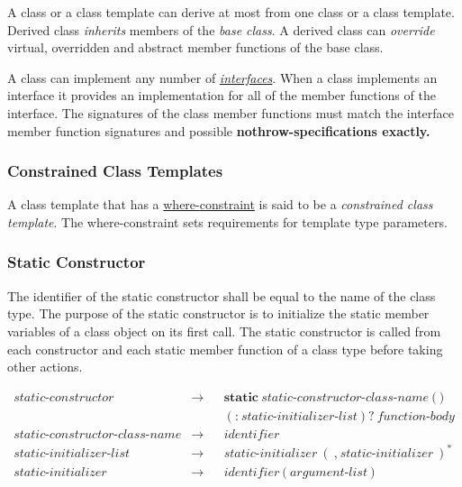 \documentclass[a4paper,oneside,11pt]{article}
\begin{document}
A class or a class template can derive at most from one class or a class template.
Derived class \emph{inherits} members of the \emph{base class}.
A derived class can \emph{override} virtual, overridden and abstract member functions of the base class.

A class can implement any number of \hyperref[sec:interface]{\emph{interfaces}}.
When a class implements an interface it provides an implementation for all of the member functions of the interface.
The signatures of the class member functions must match the interface member function signatures and possible \bf{nothrow}-specifications
exactly.

\subsubsection{Constrained Class Templates}

A class template that has a \hyperref[whereconstraint]{where\textrm{-}constraint} is said to be a \emph{constrained class template}.
The where-constraint sets requirements for template type parameters.

\subsubsection{Static Constructor}\label{staticconstructor}

The identifier of the static constructor shall be equal to the name of the class type.
The purpose of the static constructor is to initialize the static member variables of a class object on its first call.
The static constructor is called from each constructor and each static member function of a class type
before taking other actions.

\begin{align*}
static\textrm{-}constructor &\rightarrow & &\textbf{static} \> static\textrm{-}constructor\textrm{-}class\textrm{-}name \> \texttt{(} \> \texttt{)}\\
& & &(\texttt{:} \> static\textrm{-}initializer\textrm{-}list)? \> \hyperref[functionbody]{function\textrm{-}body}\\
static\textrm{-}constructor\textrm{-}class\textrm{-}name &\rightarrow & &\hyperref[identifier]{identifier}\\
static\textrm{-}initializer\textrm{-}list &\rightarrow & &static\textrm{-}initializer \> (\> \texttt{,} \> static\textrm{-}initializer \>)^*\\
static\textrm{-}initializer &\rightarrow & &\hyperref[identifier]{identifier} \> \texttt{(} \> \hyperref[argumentlist]{argument\textrm{-}list} \> \texttt{)}
\end{align*}
\end{document}
